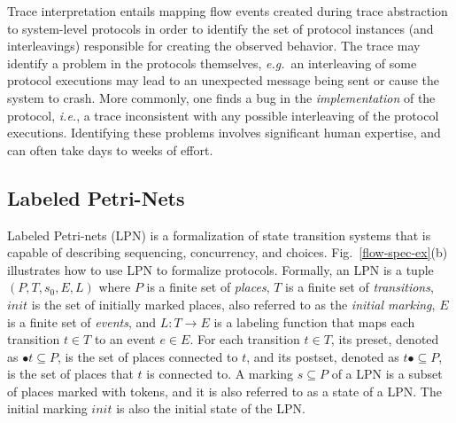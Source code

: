 \documentclass[conference]{IEEEtran}
\newcommand{\eg}{\mbox{{\em e.g.}}}
\newcommand{\ie}{\mbox{{\em i.e.}}}
\begin{document}
Trace interpretation entails mapping flow events created
during trace abstraction to system-level protocols in order
to identify the set of protocol instances (and
interleavings) responsible for creating the observed
behavior.  The trace may identify a problem in the protocols
themselves, \eg~an interleaving of some protocol executions
may lead to an unexpected message being sent or cause the
system to crash.  More commonly, one finds a bug in the {\em
  implementation} of the protocol, \ie, a trace inconsistent
with any possible interleaving of the protocol executions.
Identifying these problems involves significant human
expertise, and can often take days to weeks of effort.



\subsection{Labeled Petri-Nets}

Labeled Petri-nets (LPN) is a formalization of state
transition systems that is capable of describing sequencing,
concurrency, and choices.  Fig.~\ref{flow-spec-ex}(b)
illustrates how to use LPN to formalize protocols.
Formally, an LPN is a tuple $(P, T, s_0, E, L)$ where $P$ is
a finite set of {\em places}, $T$ is a finite set of {\em
  transitions}, $\mathit{init}$ is the set of initially
marked places, also referred to as the {\em initial
  marking}, $E$ is a finite set of {\em events}, and $L: T
\rightarrow E$ is a labeling function that maps each
transition $t \in T$ to an event $e \in E$.  For each
transition $t \in T$, its preset, denoted as $\bullet{t}
\subseteq P$, is the set of places connected to $t$, and its
postset, denoted as $t\bullet \subseteq P$, is the set of
places that $t$ is connected to.  A marking $s \subseteq P$
of a LPN is a subset of places marked with tokens, and it is
also referred to as a state of a LPN.  The initial marking
$\mathit{init}$ is also the initial state of the LPN.




\end{document}
